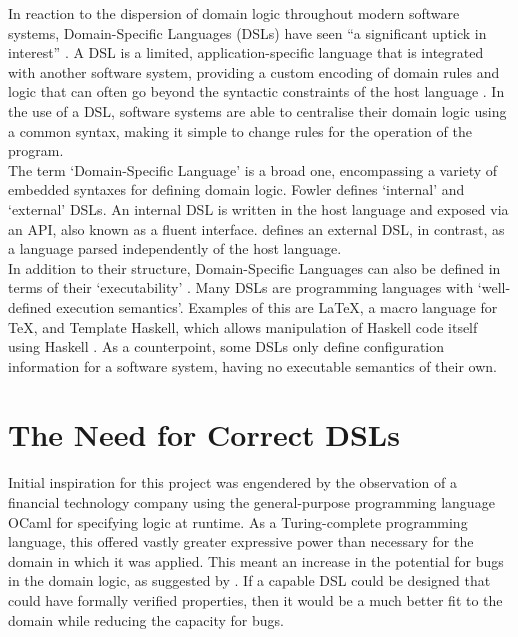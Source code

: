 In reaction to the dispersion of domain logic throughout modern software systems, Domain-Specific Languages (DSLs) have seen ``a significant uptick in interest'' \citep{fowler2010domain}. 
A DSL is a limited, application-specific language that is integrated with another software system, providing a custom encoding of domain rules and logic that can often go beyond the syntactic constraints of the host language \citep{Mernik:2005:DDL:1118890.1118892}.
In the use of a DSL, software systems are able to centralise their domain logic using a common syntax, making it simple to change rules for the operation of the program.\\

The term `Domain-Specific Language' is a broad one, encompassing a variety of embedded syntaxes for defining domain logic.
Fowler defines `internal' and `external' DSLs.
An internal DSL is written in the host language and exposed via an API, also known as a fluent interface.
\cite{fowler2010domain} defines an external DSL, in contrast, as a language parsed independently of the host language.\\

In addition to their structure, Domain-Specific Languages can also be defined in terms of their `executability' \citep{Mernik:2005:DDL:1118890.1118892}.
Many DSLs are programming languages with `well-defined execution semantics'.
Examples of this are \LaTeX, a macro language for \TeX, and Template Haskell, which allows manipulation of Haskell code itself using Haskell \citep{Sheard:2002:TMH:581690.581691}.
As a counterpoint, some DSLs only define configuration information for a software system, having no executable semantics of their own.


\section{The Need for Correct DSLs} %
\label{sec:the_need_for_correct_dsls}
Initial inspiration for this project was engendered by the observation of a financial technology company using the general-purpose programming language OCaml for specifying logic at runtime.
As a Turing-complete programming language, this offered vastly greater expressive power than necessary for the domain in which it was applied.
This meant an increase in the potential for bugs in the domain logic, as suggested by \cite{subramanyam2003empirical}.
If a capable DSL could be designed that could have formally verified properties, then it would be a much better fit to the domain while reducing the capacity for bugs.\\

